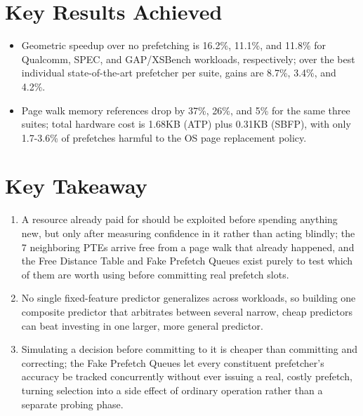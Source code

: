 \documentclass[10pt, conference]{IEEEtran}
\begin{document}
\section{Key Results Achieved}
\begin{itemize}[leftmargin=*, itemsep=2pt, topsep=2pt, parsep=1pt]
    \item Geometric speedup over no prefetching is 16.2\%, 11.1\%, and 11.8\% for Qualcomm, SPEC, and GAP/XSBench workloads, respectively; over the best individual state-of-the-art prefetcher per suite, gains are 8.7\%, 3.4\%, and 4.2\%.
    \item Page walk memory references drop by 37\%, 26\%, and 5\% for the same three suites; total hardware cost is 1.68KB (ATP) plus 0.31KB (SBFP), with only 1.7-3.6\% of prefetches harmful to the OS page replacement policy.
\end{itemize}

\section{Key Takeaway}
\begin{enumerate}[leftmargin=*, itemsep=2pt, topsep=2pt, parsep=1pt]
    \item A resource already paid for should be exploited before spending anything new, but only after measuring confidence in it rather than acting blindly; the 7 neighboring PTEs arrive free from a page walk that already happened, and the Free Distance Table and Fake Prefetch Queues exist purely to test which of them are worth using before committing real prefetch slots.
    \item No single fixed-feature predictor generalizes across workloads, so building one composite predictor that arbitrates between several narrow, cheap predictors can beat investing in one larger, more general predictor.
    \item Simulating a decision before committing to it is cheaper than committing and correcting; the Fake Prefetch Queues let every constituent prefetcher's accuracy be tracked concurrently without ever issuing a real, costly prefetch, turning selection into a side effect of ordinary operation rather than a separate probing phase.
\end{enumerate}
\end{document}
